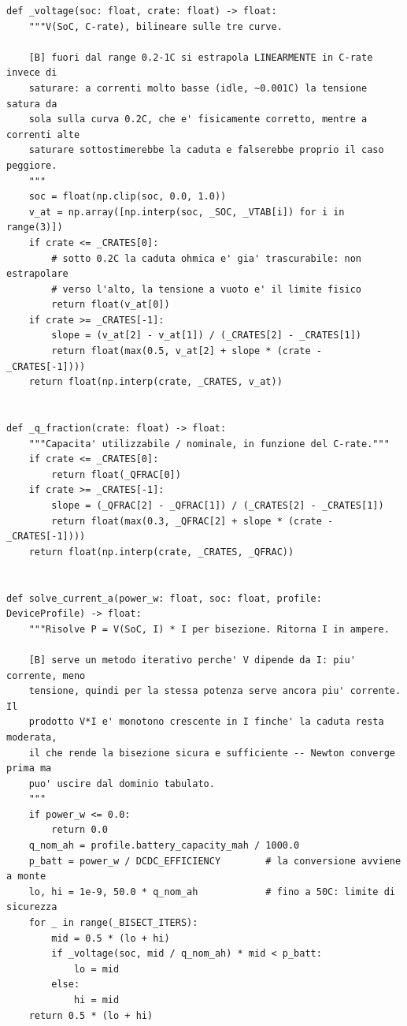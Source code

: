 \documentclass[11pt,a4paper]{article}
\begin{document}
\begin{lstlisting}[style=py,firstnumber=93,caption={\texttt{tesifl/device/battery\_model.py}, lines 93--159}]
def _voltage(soc: float, crate: float) -> float:
    """V(SoC, C-rate), bilineare sulle tre curve.

    [B] fuori dal range 0.2-1C si estrapola LINEARMENTE in C-rate invece di
    saturare: a correnti molto basse (idle, ~0.001C) la tensione satura da
    sola sulla curva 0.2C, che e' fisicamente corretto, mentre a correnti alte
    saturare sottostimerebbe la caduta e falserebbe proprio il caso peggiore.
    """
    soc = float(np.clip(soc, 0.0, 1.0))
    v_at = np.array([np.interp(soc, _SOC, _VTAB[i]) for i in range(3)])
    if crate <= _CRATES[0]:
        # sotto 0.2C la caduta ohmica e' gia' trascurabile: non estrapolare
        # verso l'alto, la tensione a vuoto e' il limite fisico
        return float(v_at[0])
    if crate >= _CRATES[-1]:
        slope = (v_at[2] - v_at[1]) / (_CRATES[2] - _CRATES[1])
        return float(max(0.5, v_at[2] + slope * (crate - _CRATES[-1])))
    return float(np.interp(crate, _CRATES, v_at))


def _q_fraction(crate: float) -> float:
    """Capacita' utilizzabile / nominale, in funzione del C-rate."""
    if crate <= _CRATES[0]:
        return float(_QFRAC[0])
    if crate >= _CRATES[-1]:
        slope = (_QFRAC[2] - _QFRAC[1]) / (_CRATES[2] - _CRATES[1])
        return float(max(0.3, _QFRAC[2] + slope * (crate - _CRATES[-1])))
    return float(np.interp(crate, _CRATES, _QFRAC))


def solve_current_a(power_w: float, soc: float, profile: DeviceProfile) -> float:
    """Risolve P = V(SoC, I) * I per bisezione. Ritorna I in ampere.

    [B] serve un metodo iterativo perche' V dipende da I: piu' corrente, meno
    tensione, quindi per la stessa potenza serve ancora piu' corrente. Il
    prodotto V*I e' monotono crescente in I finche' la caduta resta moderata,
    il che rende la bisezione sicura e sufficiente -- Newton converge prima ma
    puo' uscire dal dominio tabulato.
    """
    if power_w <= 0.0:
        return 0.0
    q_nom_ah = profile.battery_capacity_mah / 1000.0
    p_batt = power_w / DCDC_EFFICIENCY        # la conversione avviene a monte
    lo, hi = 1e-9, 50.0 * q_nom_ah            # fino a 50C: limite di sicurezza
    for _ in range(_BISECT_ITERS):
        mid = 0.5 * (lo + hi)
        if _voltage(soc, mid / q_nom_ah) * mid < p_batt:
            lo = mid
        else:
            hi = mid
    return 0.5 * (lo + hi)



\end{lstlisting}
\end{document}
